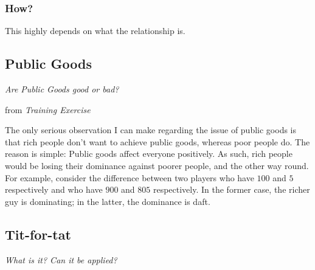 \documentclass[10pt,fleqn]{article}
\begin{document}
\subsubsection{How?}

This highly depends on what the relationship is.

\subsection{Public Goods}
\emph{Are Public Goods good or bad?}

\begin{quotation}
\end{quotation}
\hfill from \emph{Training Exercise}

The only serious observation I can make regarding the issue of public goods is
that rich people don't want to achieve public goods, whereas poor people do. The
reason is simple: Public goods affect everyone positively. As such, rich people
would be losing their dominance against poorer people, and the other way round.
For example, consider the difference between two players who have $100$ and $5$
respectively and who have $900$ and $805$ respectively. In the former case, the
richer guy is dominating; in the latter, the dominance is daft.

\subsection{Tit-for-tat}
\emph{What is it? Can it be applied?}
\end{document}
